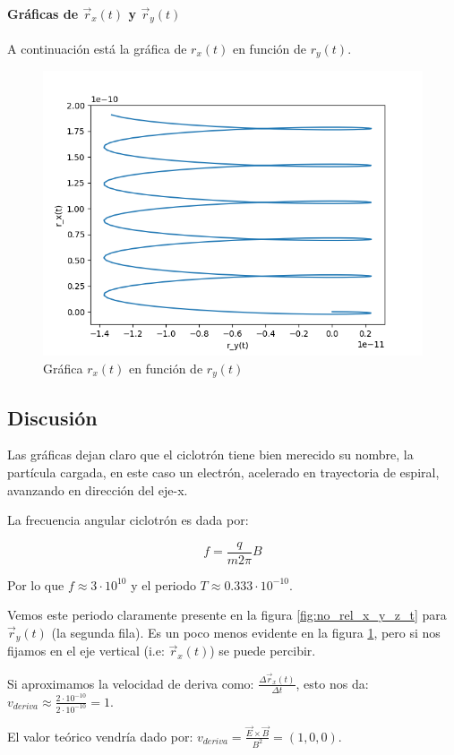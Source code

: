 \newpage 

\paragraph{Gráficas de $\vec{r}_x(t)$ y $\vec{r}_y(t)$}

A continuación está la gráfica de $r_x(t)$ en función de $r_y(t)$.

\begin{figure}[H]
	\includegraphics[width=\linewidth]{figures/no_rel_y_x.png}
	\caption{Gráfica $r_x(t)$ en función de $r_y(t)$}
	\label{fig:no_rel_y_x}
\end{figure}

\subsection{Discusión}

Las gráficas dejan claro que el ciclotrón tiene bien merecido su nombre, la partícula cargada, en este caso un electrón, acelerado en trayectoria de espiral, avanzando en dirección del eje-x.

La frecuencia angular ciclotrón es dada por:

$$
f = \frac{q}{m 2 \pi}B
$$

Por lo que $f \approx 3 \cdot 10^{10}$ y el periodo $T \approx 0.333 \cdot 10^{-10}$.

Vemos este periodo claramente presente en la figura \ref{fig:no_rel_x_y_z_t} para $\vec{r}_y(t)$ (la segunda fila). Es un poco menos evidente en la figura \ref{fig:no_rel_y_x}, pero si nos fijamos en el eje vertical (i.e: $\vec{r}_x(t)$) se puede percibir.

Si aproximamos la velocidad de deriva como: $\frac{\Delta \vec{r}_x(t)}{\Delta t}$, esto nos da: $v_{deriva} \approx \frac{2 \cdot 10^{-10}}{2 \cdot 10^{-10}} = 1$.

El valor teórico vendría dado por: $v_{deriva} = \frac{\vec{E} \times \vec{B}}{B^2} = (1, 0, 0)$.